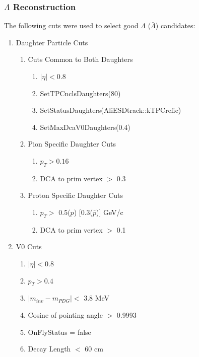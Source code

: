 \documentclass[../AnalysisNoteJBuxton.tex]{subfiles}
\begin{document}
\subsubsection{\texorpdfstring{$\Lambda$}{TEXT} Reconstruction}
\label{LambdaReconstruction}

The following cuts were used to select good $\Lambda$ ($\bar{\Lambda}$) candidates:

\begin{enumerate}
 \item Daughter Particle Cuts
 \begin{enumerate}
  \item{Cuts Common to Both Daughters}
  \begin{enumerate}
   \item $|\eta| < 0.8$
   \item SetTPCnclsDaughters(80)
   \item SetStatusDaughters(AliESDtrack::kTPCrefic)
   \item SetMaxDcaV0Daughters(0.4)
  \end{enumerate}
  \item Pion Specific Daughter Cuts 
  \begin{enumerate}
   \item $p_{T} > 0.16$
   \item DCA to prim vertex $>$ 0.3
  \end{enumerate}
  \item Proton Specific Daughter Cuts
  \begin{enumerate}
   \item $p_{T} > $ 0.5($p$) [0.3($\bar{p}$)] GeV/c
   \item DCA to prim vertex $>$ 0.1 
  \end{enumerate}
 \end{enumerate}
 \item V0 Cuts
 \begin{enumerate}
  \item $|\eta| < 0.8$
  \item $p_{T} > 0.4$
  \item $|m_{inv} - m_{PDG}| <$ 3.8 MeV
  \item Cosine of pointing angle $>$ 0.9993
  \item OnFlyStatus = false
  \item Decay Length $<$ 60 cm
 \end{enumerate}
\end{enumerate} 
\end{document}
